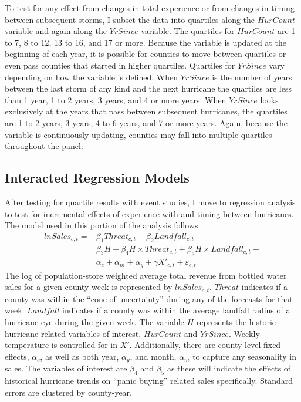 \documentclass{article}
\begin{document}
To test for any effect from changes in total experience or from changes in timing between subsequent storms, I subset the data into quartiles along the $HurCount$ variable and again along the $YrSince$ variable. The quartiles for $HurCount$ are 1 to 7, 8 to 12, 13 to 16, and 17 or more. Because the variable is updated at the beginning of each year, it is possible for counties to move between quartiles or even pass counties that started in higher quartiles. Quartiles for $YrSince$ vary depending on how the variable is defined. When $YrSince$ is the number of years between the last storm of any kind and the next hurricane the quartiles are less than 1 year, 1 to 2 years, 3 years, and 4 or more years. When $YrSince$ looks exclusively at the years that pass between subsequent hurricanes, the quartiles are 1 to 2 years, 3 years, 4 to 6 years, and 7 or more years. Again, because the variable is continuously updating, counties may fall into multiple quartiles throughout the panel. 


\subsection{Interacted Regression Models}

After testing for quartile results with event studies, I move to regression analysis to test for incremental effects of experience with and timing between hurricanes. The model used in this portion of the analysis follows. 
\begin{equation}
\begin{split}
lnSales_{c,t} = &\beta_1 Threat_{c,t} + \beta_2 Landfall_{c,t} +\\ & \beta_3 H + \beta_4 H\times Threat_{c,t} + \beta_5 H\times Landfall_{c,t}+\\ &\alpha_c + \alpha_m + \alpha_y + \gamma X'_{c,t} + \varepsilon_{c,t}
\label{eq:gen_reg}
\end{split}
\end{equation}
The log of population-store weighted average total revenue from bottled water sales for a given county-week is represented by $lnSales_{c,t}$. $Threat$ indicates if a county was within the ``cone of uncertainty'' during any of the forecasts for that week. $Landfall$ indicates if a county was within the average landfall radius of a hurricane eye during the given week. The variable $H$ represents the historic hurricane related variables of interest, $HurCount$ and $YrSince$. Weekly temperature is controlled for in $X'$. Additionally, there are county level fixed effects, $\alpha_c$, as well as both year, $\alpha_y$, and month, $\alpha_m$ to capture any seasonality in sales. The variables of interest are $\beta_4$ and $\beta_5$ as these will indicate the effects of historical hurricane trends on ``panic buying'' related sales specifically. Standard errors are clustered by county-year. 
\end{document}
